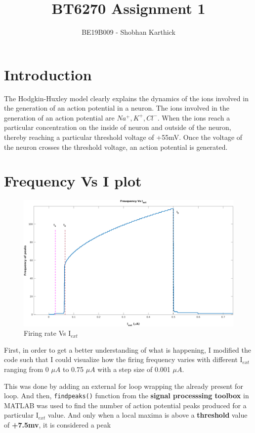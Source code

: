 \documentclass[12pt, a4paper]{article}
\author{BE19B009 - Shobhan Karthick}
\title{BT6270 Assignment 1}
\date{}
\begin{document}
\maketitle

\section{Introduction}

The Hodgkin-Huxley model clearly explains the dynamics of the ions involved in the generation of an action potential in a neuron.
The ions involved in the generation of an action potential are $ Na^{+}, K^{+}, Cl^{-} $.
When the ions reach a particular concentration on the inside of neuron and outside of the neuron, thereby reaching a particular threshold voltage of +55mV. 
Once the voltage of the neuron crosses the threshold voltage, an action potential is generated.

\section{Frequency Vs I plot}
\label{intro}
\begin{figure}[h] 
    \includegraphics[width=\textwidth]{Q2_1}
    \caption{Firing rate Vs  I$ _{ext} $}
    \label{fig:Q2_1}
\end{figure}

First, in order to get a better understanding of what is happening, I modified the code such that I could visualize how the firing frequency varies with different I{$_{ext}$} ranging from 0 $ \mu A $ to 0.75 $ \mu A $ with a step size of 0.001 $ \mu A $.

This was done by adding an external for loop wrapping the already present for loop. And then, \texttt{findpeaks()} function from the \textbf{signal processsing toolbox} in MATLAB was used to find the number of action potential peaks produced for a particular I{$_{ext}$} value. And only when a local maxima is above a \textbf{threshold} value of \textbf{+7.5mv}, it is considered a peak 
\end{document}
